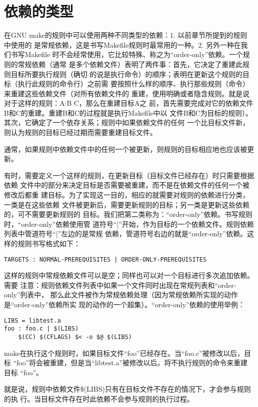 \section{依赖的类型}
在GNU make的规则中可以使用两种不同类型的依赖：1. 以前章节所提到的规则中使用的
是常规依赖，这是书写Makefile规则时最常用的一种。2. 另外一种在我们书写Makefile
时不会经常使用，它比较特殊、称之为“order-only”依赖。一个规则的常规依赖（通常
是多个依赖文件）表明了两件事：首先，它决定了重建此规则目标所要执行规则（确切
的说是执行命令）的顺序；表明在更新这个规则的目标（执行此规则的命令行）之前需
要按照什么样的顺序、执行那些规则（命令）来重建这些依赖文件（对所有依赖文件的
重建，使用明确或者隐含规则。就是说对于这样的规则：A:B C，那么在重建目标A之
前，首先需要完成对它的依赖文件B和C的重建。重建B和C的过程就是执行Makefile中以
文件B和C为目标的规则）。其次，它确定了一个依存关系；规则中如果依赖文件的任何
一个比目标文件新，则认为规则的目标已经过期而需要重建目标文件。

通常，如果规则中依赖文件中的任何一个被更新，则规则的目标相应地也应该被更新。

有时，需要定义一个这样的规则，在更新目标（目标文件已经存在）时只需要根据依赖
文件中的部分来决定目标是否需要被重建，而不是在依赖文件的任何一个被修改后都重
建目标。为了实现这一目的，相应的就需要对规则的依赖进行分类，一类是在这些依赖
文件被更新后，需要更新规则的目标；另一类是更新这些依赖的，可不需要更新规则的
目标。我们把第二类称为：“order-only”依赖。书写规则时，“order-only”依赖使用管
道符号“|”开始，作为目标的一个依赖文件。规则依赖列表中管道符号“|”左边的是常规
依赖，管道符号右边的就是“order-only”依赖。这样的规则书写格式如下：

\begin{Verbatim}[]
TARGETS : NORMAL-PREREQUISITES | ORDER-ONLY-PREREQUISITES
\end{Verbatim}


这样的规则中常规依赖文件可以是空；同样也可以对一个目标进行多次追加依赖。需要
注意：规则依赖文件列表中如果一个文件同时出现在常规列表和“order-only”列表中，
那么此文件被作为常规依赖处理（因为常规依赖所实现的动作是“order-only”依赖所实
现的动作的一个超集）。“order-only”依赖的使用举例：
\begin{Verbatim}[]
LIBS = libtest.a
foo : foo.c | $(LIBS)
    $(CC) $(CFLAGS) $< -o $@ $(LIBS)
\end{Verbatim}

make在执行这个规则时，如果目标文件“foo”已经存在。当“foo.c”被修改以后，目标
“foo”将会被重建，但是当“libtest.a”被修改以后。将不执行规则的命令来重建目标
“foo”。

就是说，规则中依赖文件\$(LIBS)只有在目标文件不存在的情况下，才会参与规则的执
行。当目标文件存在时此依赖不会参与规则的执行过程。

